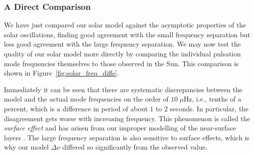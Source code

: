 \subsubsection*{A Direct Comparison} 
We have just compared our solar model against the asymptotic properties of the solar oscillations, finding good agreement with the small frequency separation but less good agreement with the large frequency separation. 
We may now test the quality of our solar model more directly by comparing the individual pulsation mode frequencies themselves to those observed in the Sun. 
This comparison is shown in Figure~\ref{fig:solar_freq_diffs}. 

Immediately it can be seen that there are systematic discrepancies between the model and the actual mode frequencies on the order of ${10\;\mu\text{Hz}}$, i.e., tenths of a percent, which is a difference in period of about $1$ to $2$ seconds. 
In particular, the disagreement gets worse with increasing frequency. 
This phenomenon is called the \emph{surface effect} and has arisen from our improper modelling of the near-surface layers \citep[e.g.,][]{1984srps.conf...11C}. 
The large frequency separation is also sensitive to surface effects, which is why our model ${\Delta\nu}$ differed so significantly from the observed value. 

